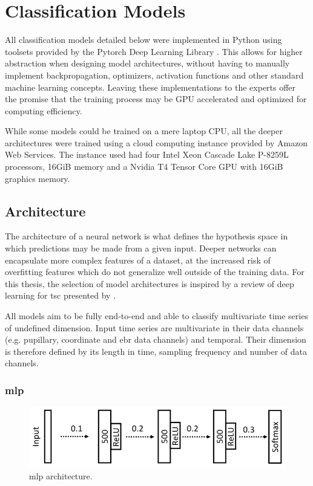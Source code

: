\section{Classification Models}

All classification models detailed below were implemented in Python using toolsets provided by the Pytorch Deep Learning Library \cite{paszke2019}. This allows for higher abstraction when designing model architectures, without having to manually implement backpropagation, optimizers, activation functions and other standard machine learning concepts. Leaving these implementations to the experts offer the promise that the training process may be GPU accelerated and optimized for computing efficiency.

While some models could be trained on a mere laptop CPU, all the deeper architectures were trained using a cloud computing instance provided by Amazon Web Services. The instance used had four Intel Xeon Cascade Lake P-8259L processors, 16GiB memory and a  Nvidia T4 Tensor Core GPU with 16GiB graphics memory.

\subsection{Architecture}

The architecture of a neural network is what defines the hypothesis space in which predictions may be made from a given input. Deeper networks can encapsulate more complex features of a dataset, at the increased risk of overfitting features which do not generalize well outside of the training data. For this thesis, the selection of model architectures is inspired by a review of deep learning for \acrshort{tsc} presented by \textcite{fawaz2018}. 

All models aim to be fully end-to-end and able to classify multivariate time series of undefined dimension. Input time series are multivariate in their data channels (e.g. pupillary, coordinate and \acrshort{ebr} data channels) and temporal. Their dimension is therefore defined by its length in time, sampling frequency and number of data channels. 

\subsubsection{\acrlong{mlp}}

\begin{figure}[h]
    \centering
    \includegraphics[width=\textwidth]{figures/impl_MLP.png}
    \caption{\acrlong{mlp} architecture. }
    \label{fig:impl_MLP}
\end{figure}

